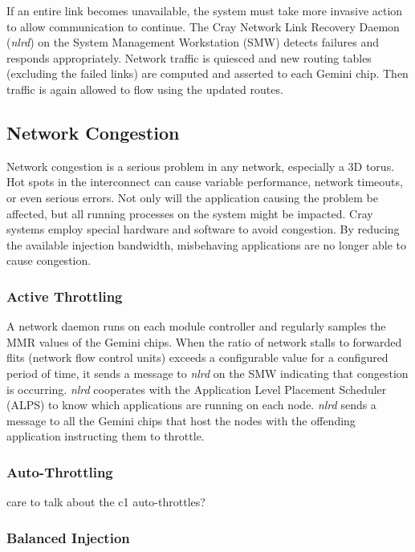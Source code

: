 \documentclass[10pt, conference, compsocconf]{IEEEtran}
\begin{document}
If an entire link becomes unavailable, the system must take more invasive
action to allow communication to continue.  The Cray Network Link Recovery
Daemon (\emph{nlrd}) on the System Management Workstation (SMW) detects failures and
responds appropriately.  Network traffic is quiesced and new routing tables
(excluding the failed links) are computed and asserted to each Gemini chip.
Then traffic is again allowed to flow using the updated routes.

\subsection{Network Congestion}

Network congestion is a serious problem in any network, especially a 3D torus.
Hot spots in the interconnect can cause variable performance, network timeouts,
or even serious errors.  Not only will the application causing the problem be
affected, but all running processes on the system might be impacted.  Cray
systems employ special hardware and software to avoid congestion.  By reducing
the available injection bandwidth, misbehaving applications are no longer able
to cause congestion.

\subsubsection{Active Throttling}

A network daemon runs on each module controller and regularly samples the MMR
values of the Gemini chips.  When the ratio of network stalls to forwarded
flits (network flow control units) exceeds a configurable value for a
configured period of time, it sends a message to \emph{nlrd} on the SMW indicating
that congestion is occurring.  \emph{nlrd} cooperates with the Application Level
Placement Scheduler (ALPS) to know which applications are running on each node.
\emph{nlrd} sends a message to all the Gemini chips that host the nodes with the
offending application instructing them to throttle.

\subsubsection{Auto-Throttling}

care to talk about the c1 auto-throttles?

\subsubsection{Balanced Injection}
\end{document}
